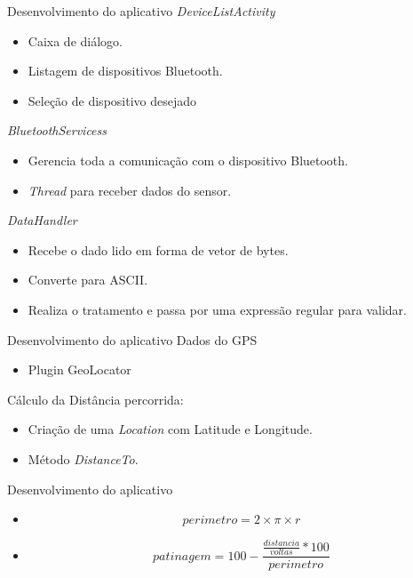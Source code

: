 \documentclass[12pt]{beamer}
\begin{document}
\begin{frame}{Desenvolvimento do aplicativo}
    \textit{DeviceListActivity}
        \begin{itemize}
            \item Caixa de diálogo.
            \item Listagem de dispositivos Bluetooth.
            \item Seleção de dispositivo desejado
        \end{itemize}
    \textit{BluetoothServicess}
        \begin{itemize}
            \item Gerencia toda a comunicação com o dispositivo Bluetooth.
            \item \textit{Thread} para receber dados do sensor.
        \end{itemize}
    \textit{DataHandler}
        \begin{itemize}
            \item Recebe o dado lido em forma de vetor de bytes.
            \item Converte para ASCII.
            \item Realiza o tratamento e passa por uma expressão regular para validar.
        \end{itemize}
\end{frame}

\begin{frame}{Desenvolvimento do aplicativo}
    Dados do GPS\begin{itemize}
        \item Plugin GeoLocator
    \end{itemize}
    Cálculo da Distância percorrida:
    \begin{itemize}
        \item Criação de uma \textit{Location} com Latitude e Longitude.
        \item Método \textit{DistanceTo}.
    \end{itemize}
\end{frame}

\begin{frame}{Desenvolvimento do aplicativo}
    \begin{itemize}
        \item \begin{equation}
            perimetro = 2 \times \pi \times r
            \label{eq:perimetro}
            \end{equation}
        \vspace{0.4cm}
        \item \begin{equation}
            patinagem = 100 - \frac{\frac{distancia}{voltas}*100} {perimetro}
            \label{eq:patinagem}
            \end{equation}
    \end{itemize}
\end{frame}
\end{document}
